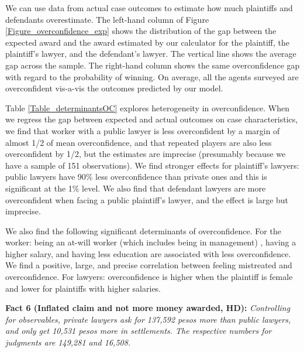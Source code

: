 \documentclass[11pt]{article}
\begin{document}
We can use data from actual case outcomes to estimate how much plaintiffs and defendants overestimate. The left-hand column of Figure \ref{Figure_overconfidence_exp} shows the distribution of the gap between the expected award and the award estimated by our calculator for the plaintiff, the plaintiff’s lawyer, and the defendant’s lawyer. The vertical line shows the average gap across the sample. The right-hand column shows the same overconfidence gap with regard to the probability of winning. On average, all the agents surveyed are overconfident vis-a-vis the outcomes predicted by our model.

Table \ref{Table_determinantsOC} explores heterogeneity in overconfidence. When we regress the gap between expected and actual outcomes on case characteristics, we find that worker with a public lawyer is less overconfident by a margin of almost 1/2 of mean overconfidence, and that repeated players are also less overconfident by 1/2, but the estimates are imprecise (presumably because we have a sample of 151 observations). We find stronger effects for plaintiff's lawyers: public lawyers have 90\% less overconfidence than private ones and this is significant at the 1\% level. We also find that defendant lawyers are more overconfident when facing a public plaintiff's lawyer, and the effect is large but imprecise.

We also find the following significant determinants of overconfidence. For the worker: being an at-will worker (which includes being in management) , having a higher salary, and having less education are associated with less overconfidence. We find a positive, large, and precise correlation between feeling mistreated and overconfidence. For lawyers: overconfidence is higher when the plaintiff is female and lower for plaintiffs with higher salaries.



\vspace{.3in}
\begin{singlespace}
\textbf{Fact 6 (Inflated claim and not more money awarded, HD):} \emph{Controlling for observables, private lawyers ask for 137,592 pesos more than public lawyers, and only get 10,531 pesos more in settlements. The respective numbers for judgments are 149,281 and 16,508.}
\end{singlespace}
\vspace{.1in}
\end{document}
